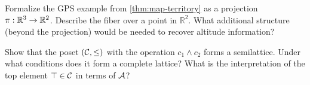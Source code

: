 \begin{exercise}
  Formalize the GPS example from \cref{thm:map-territory} as a projection
  $\pi : \mathbb{R}^3 \to \mathbb{R}^2$. Describe the fiber over a point
  in $\mathbb{R}^2$. What additional structure (beyond the projection) would
  be needed to recover altitude information?
\end{exercise}

\begin{exercise}[title={Harder}]
  Show that the poset $(\mathcal{C}, \leq)$ with the operation
  $c_1 \wedge c_2$ forms a semilattice. Under what conditions does it form
  a complete lattice? What is the interpretation of the top element
  $\top \in \mathcal{C}$ in terms of $\mathcal{A}$?
\end{exercise}
